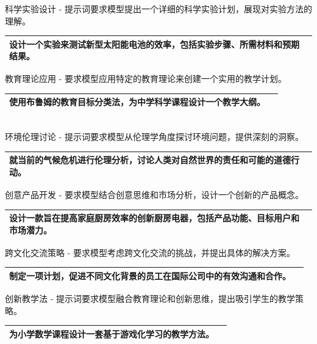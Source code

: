 \documentclass[12pt]{book}
\begin{document}
\bigskip
科学实验设计  - 提示词要求模型提出一个详细的科学实验计划，展现对实验方法的理解。

\begin{tabular}{|p{15cm}|p{3cm}|}
	\hline
设计一个实验来测试新型太阳能电池的效率，包括实验步骤、所需材料和预期结果。\\
	\hline
\end{tabular}



\bigskip
教育理论应用  - 要求模型应用特定的教育理论来创建一个实用的教学计划。

\begin{tabular}{|p{15cm}|p{3cm}|}
	\hline
	使用布鲁姆的教育目标分类法，为中学科学课程设计一个教学大纲。\\
	\hline
\end{tabular}\\



\bigskip
环境伦理讨论  - 提示词要求模型从伦理学角度探讨环境问题，提供深刻的洞察。

\begin{tabular}{|p{15cm}|p{3cm}|}
	\hline
就当前的气候危机进行伦理分析，讨论人类对自然世界的责任和可能的道德行动。\\
	\hline
\end{tabular}



\bigskip
创意产品开发  - 要求模型结合创意思维和市场分析，设计一个创新的产品概念。

\begin{tabular}{|p{15cm}|p{3cm}|}
	\hline
设计一款旨在提高家庭厨房效率的创新厨房电器，包括产品功能、目标用户和市场潜力。\\
	\hline
\end{tabular}




\bigskip
跨文化交流策略  - 要求模型考虑跨文化交流的挑战，并提出具体的解决方案。

\begin{tabular}{|p{15cm}|p{3cm}|}
	\hline
制定一项计划，促进不同文化背景的员工在国际公司中的有效沟通和合作。\\
	\hline
\end{tabular}




\bigskip
创新教学法  - 提示词要求模型融合教育理论和创新思维，提出吸引学生的教学策略。

\begin{tabular}{|p{15cm}|p{3cm}|}
	\hline
为小学数学课程设计一套基于游戏化学习的教学方法。\\
	\hline
\end{tabular}\\
\end{document}
